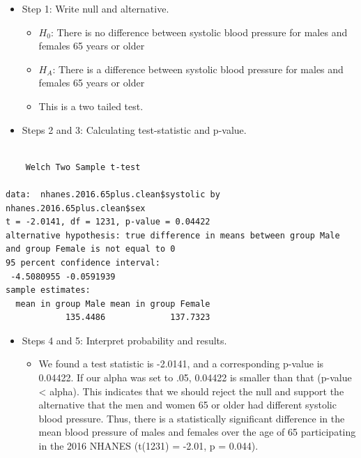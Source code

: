 \documentclass[
  letterpaper,
  DIV=11,
  numbers=noendperiod]{scrreprt}
\newenvironment{Shaded}{\begin{snugshade}}{\end{snugshade}}
\newcommand{\FloatTok}[1]{\textcolor[rgb]{0.68,0.00,0.00}{#1}}
\newcommand{\FunctionTok}[1]{\textcolor[rgb]{0.28,0.35,0.67}{#1}}
\newcommand{\NormalTok}[1]{\textcolor[rgb]{0.00,0.23,0.31}{#1}}
\newcommand{\SpecialCharTok}[1]{\textcolor[rgb]{0.37,0.37,0.37}{#1}}
\providecommand{\tightlist}{%
  \setlength{\itemsep}{0pt}\setlength{\parskip}{0pt}}\usepackage{longtable,booktabs,array}
\begin{document}
\begin{itemize}
\tightlist
\item
  Step 1: Write null and alternative.

  \begin{itemize}
  \tightlist
  \item
    \(H_0\): There is no difference between systolic blood pressure for
    males and females 65 years or older
  \item
    \(H_A\): There is a difference between systolic blood pressure for
    males and females 65 years or older
  \item
    This is a two tailed test.
  \end{itemize}
\item
  Steps 2 and 3: Calculating test-statistic and p-value.
\end{itemize}

\begin{Shaded}
\end{Shaded}

\begin{verbatim}

    Welch Two Sample t-test

data:  nhanes.2016.65plus.clean$systolic by nhanes.2016.65plus.clean$sex
t = -2.0141, df = 1231, p-value = 0.04422
alternative hypothesis: true difference in means between group Male and group Female is not equal to 0
95 percent confidence interval:
 -4.5080955 -0.0591939
sample estimates:
  mean in group Male mean in group Female 
            135.4486             137.7323 
\end{verbatim}

\begin{itemize}
\tightlist
\item
  Steps 4 and 5: Interpret probability and results.

  \begin{itemize}
  \tightlist
  \item
    We found a test statistic is -2.0141, and a corresponding p-value is
    0.04422. If our alpha was set to .05, 0.04422 is smaller than that
    (p-value \textless{} alpha). This indicates that we should reject
    the null and support the alternative that the men and women 65 or
    older had different systolic blood pressure. Thus, there is a
    statistically significant difference in the mean blood pressure of
    males and females over the age of 65 participating in the 2016
    NHANES (t(1231) = -2.01, p = 0.044).
  \end{itemize}
\end{itemize}
\end{document}
